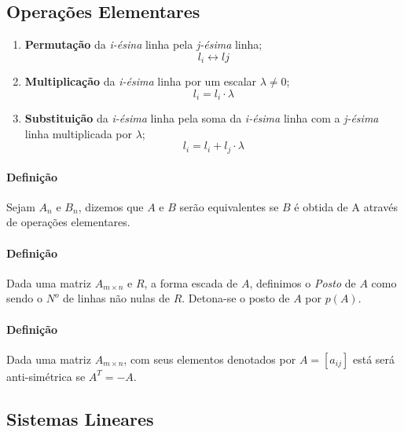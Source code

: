 \documentclass{article}
\begin{document}
        \subsection{Operações Elementares}
                \begin{enumerate}[noitemsep]
                    \item \textbf{Permutação} da \textit{i-ésina} linha pela \textit{j-ésima} linha;
                        \[l_{i} \leftrightarrow l{j}\]
                    \item \textbf{Multiplicação} da \textit{i-ésima} linha por um escalar $\lambda \neq 0$;
                        \[l_{i} = l_{i} \cdot \lambda\]
                    \item \textbf{Substituição} da \textit{i-ésima} linha pela soma da \textit{i-ésima} linha com a \textit{j-ésima} linha multiplicada por $\lambda$;
                        \[l_{i} = l_{i} + l_{j} \cdot \lambda\]
                \end{enumerate}
            
            \paragraph{Definição}Sejam $A_{n}$ e $B_{n}$, dizemos que $A$ e $B$ serão equivalentes se  $B$ é  obtida de A através de operações elementares.

            \paragraph{Definição}Dada uma matriz $A_{m \times n}$ e $R$, a forma escada de $A$, definimos o \textit{Posto} de $A$ como sendo o $N^{o}$ de linhas não nulas de $R$. Detona-se o posto de $A$ por $p(A)$.

            \paragraph{Definição}Dada uma matriz $A_{m \times n}$, com seus elementos denotados por $A=[a_{ij}]$ está será anti-simétrica se $A^{T}=-A$.

        \subsection{Sistemas Lineares}
\end{document}
